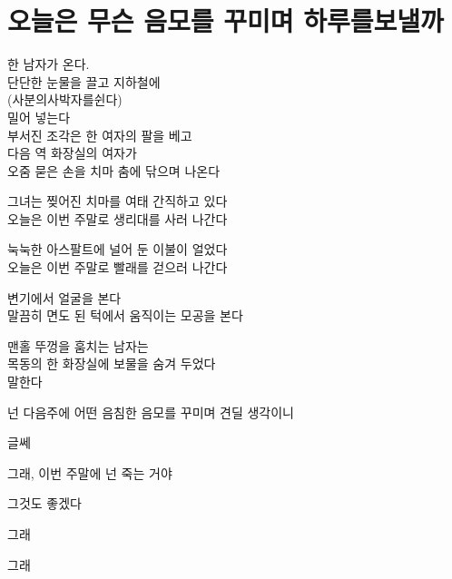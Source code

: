 \hypertarget{uxc624uxb298uxc740-uxbb34uxc2a8-uxc74cuxbaa8uxb97c-uxafb8uxbbf8uxba70-uxd558uxb8e8uxb97cuxbcf4uxb0bcuxae4c}{%

\chapter{오늘은 무슨 음모를 꾸미며 하루를보낼까}\label{uxc624uxb298uxc740-uxbb34uxc2a8-uxc74cuxbaa8uxb97c-uxafb8uxbbf8uxba70-uxd558uxb8e8uxb97cuxbcf4uxb0bcuxae4c}}



한 남자가 온다.\\

단단한 눈물을 끌고 지하철에\\

(사분의사박자를쉰다)\\

밀어 넣는다\\

부서진 조각은 한 여자의 팔을 베고\\

다음 역 화장실의 여자가\\

오줌 묻은 손을 치마 춤에 닦으며 나온다



그녀는 찢어진 치마를 여태 간직하고 있다\\

오늘은 이번 주말로 생리대를 사러 나간다



눅눅한 아스팔트에 널어 둔 이불이 얼었다\\

오늘은 이번 주말로 빨래를 걷으러 나간다



변기에서 얼굴을 본다\\

말끔히 면도 된 턱에서 움직이는 모공을 본다



맨홀 뚜껑을 훔치는 남자는\\

목동의 한 화장실에 보물을 숨겨 두었다\\

말한다



\begin{description}

\tightlist

\item[그녀가 꺼낸 편지엔 내 유언이 적혀 있었다.]

넌 다음주에 어떤 음침한 음모를 꾸미며 견딜 생각이니



글쎄



그래, 이번 주말에 넌 죽는 거야



그것도 좋겠다



그래



그래

\end{description}



